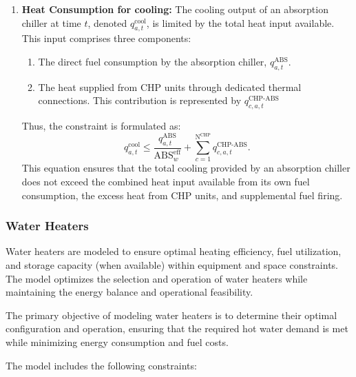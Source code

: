 \documentclass[11pt]{article}
\begin{document}
\begin{enumerate}
    \item \textbf{Heat Consumption for cooling:}
    The cooling output of an absorption chiller at time \(t\), denoted \(q^\text{cool}_{a,t}\), is limited by the total heat input available. This input comprises three components:
    \begin{enumerate}
        \item The direct fuel consumption by the absorption chiller, \(q^\text{ABS}_{a,t}\).
        \item The heat supplied from CHP units through dedicated thermal connections. This contribution is represented by \(q^\text{CHP-ABS}_{c,a,t}\)
    \end{enumerate}
    Thus, the constraint is formulated as:
    \[
    q^\text{cool}_{a,t} \leq \frac{q^\text{ABS}_{a,t}}{\text{ABS}^\text{eff}_w} +
    \sum_{c=1}^{\text{N}^\text{CHP}} q^\text{CHP-ABS}_{c,a,t}.
    \]
    This equation ensures that the total cooling provided by an absorption chiller does not exceed the combined heat input available from its own fuel consumption, the excess heat from CHP units, and supplemental fuel firing.        
\end{enumerate}

\subsubsection{Water Heaters}
\label{sec:wh}

Water heaters are modeled to ensure optimal heating efficiency, fuel utilization, and storage capacity (when available) within equipment and space constraints. The model optimizes the selection and operation of water heaters while maintaining the energy balance and operational feasibility.

The primary objective of modeling water heaters is to determine their optimal configuration and operation, ensuring that the required hot water demand is met while minimizing energy consumption and fuel costs.

The model includes the following constraints:
\end{document}
